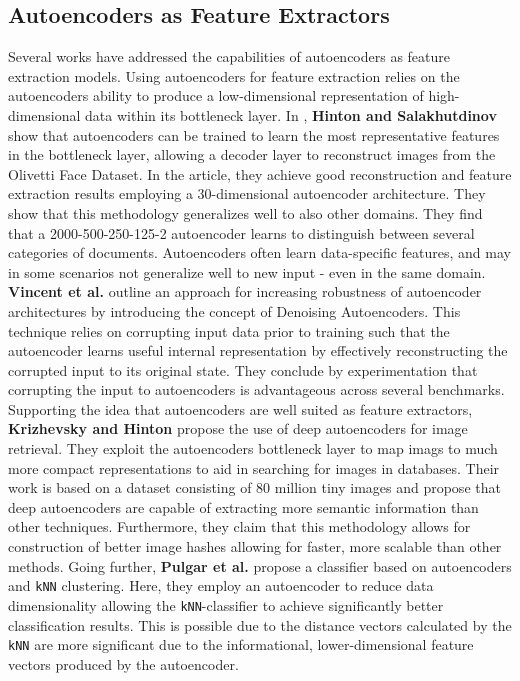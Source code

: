 \subsection{Autoencoders as Feature Extractors}
Several works have addressed the capabilities of autoencoders as feature extraction models. 
Using autoencoders for feature extraction relies on the autoencoders ability to produce a low-dimensional representation of high-dimensional data within its bottleneck layer.
\newline
In \autocite{HintonScience2006}, \textbf{Hinton and Salakhutdinov} show that autoencoders can be trained to learn the most representative features in the bottleneck layer, allowing a decoder layer to reconstruct images from the Olivetti Face Dataset.
In the article, they achieve good reconstruction and feature extraction results employing a 30-dimensional autoencoder architecture. 
They show that this methodology generalizes well to also other domains. They find that a 2000-500-250-125-2 autoencoder learns to distinguish between several categories of documents. 
\newline
Autoencoders often learn data-specific features, and may in some scenarios not generalize well to new input - even in the same domain. 
\textbf{Vincent et al.}\autocite{Vincent2008} outline an approach for increasing robustness of autoencoder architectures by introducing the concept of Denoising Autoencoders.
This technique relies on corrupting input data prior to training such that the autoencoder learns useful internal representation by effectively reconstructing the corrupted input to its original state. 
They conclude by experimentation that corrupting the input to autoencoders is advantageous across several benchmarks. 
\newline
Supporting the idea that autoencoders are well suited as feature extractors, \textbf{Krizhevsky and Hinton}\autocite{Krizhevsky2010} propose the use of deep autoencoders for image retrieval. 
They exploit the autoencoders bottleneck layer to map imags to much more compact representations to aid in searching for images in databases. 
Their work is based on a dataset consisting of 80 million tiny images and propose that deep autoencoders are capable of extracting more semantic information than other techniques.
Furthermore, they claim that this methodology allows for construction of better image hashes allowing for faster, more scalable than other methods.
\newline
Going further, \textbf{Pulgar et al.}\autocite{Pulgar2018} propose a classifier based on autoencoders and \texttt{kNN} clustering. 
Here, they employ an autoencoder to reduce data dimensionality allowing the \texttt{kNN}-classifier to achieve significantly better classification results. 
This is possible due to the distance vectors calculated by the \texttt{kNN} are more significant due to the informational, lower-dimensional feature vectors produced by the autoencoder.


